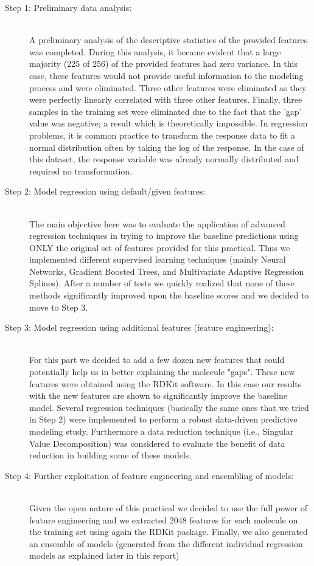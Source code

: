 \documentclass{article}
\begin{document}
\begin{description}

\item[Step 1: Preliminary data analysis:] \hfill \\
A preliminary analysis of the descriptive statistics of the provided features was completed. During this analysis, it became evident that a large majority (225 of 256) of the provided features had zero variance. In this case, these features would not provide useful information to the modeling process and were eliminated. Three other features were eliminated as they were perfectly linearly correlated with three other features. Finally, three samples in the training set were eliminated due to the fact that the 'gap' value was negative; a result which is theoretically impossible.
In regression problems, it is common practice to transform the response data to fit a normal distribution often by taking the log of the response. In the case of this dataset, the response variable was already normally distributed and required no transformation.
\item[Step 2: Model regression using default/given features:] \hfill \\
The main objective here was to evaluate the application of advanced regression techniques in trying to improve the baseline predictions using ONLY the original set of features provided for this practical. Thus we implemented different supervised learning techniques (mainly Neural Networks, Gradient Boosted Trees, and Multivariate Adaptive Regression Splines). After a number of tests we quickly realized that none of these methods significantly improved upon the baseline scores and we decided to move to Step 3.
\item[Step  3: Model regression using additional features (feature engineering):] \hfill \\
For this part we decided to add a few dozen new features that could potentially help us in better explaining the molecule "gaps". These new features were obtained using the RDKit software. In this case our results with the new features are shown to significantly improve the baseline model. Several regression techniques (basically the same ones that we tried in Step 2) were implemented to perform a robust data-driven predictive modeling study. Furthermore a data reduction technique (i.e., Singular Value Decomposition) was considered to evaluate the benefit of data reduction in building some of these models.
\item[Step  4: Further exploitation of feature engineering and ensembling of models:] \hfill \\
Given the open nature of this practical we decided to use the full power of feature engineering and we extracted 2048 features for each molecule on the training set using again the RDKit package.  Finally, we also generated an ensemble of models (generated from the different individual regression models as explained later in this report)

\end{description}
\end{document}
